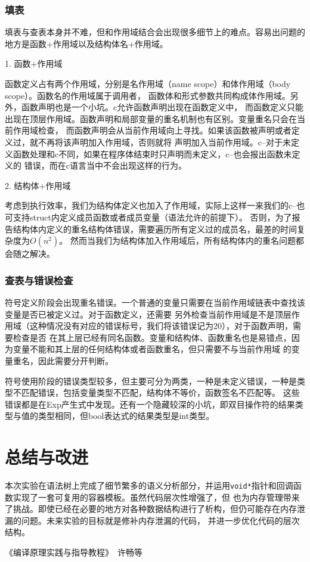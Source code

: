 \documentclass[twocolumn]{article}
\begin{document}
\subsubsection{填表}
填表与查表本身并不难，但和作用域结合会出现很多细节上的难点。容易出问题的地方是函数+作用域以及结构体名+作用域。

1. 函数+作用域

函数定义占有两个作用域，分别是名作用域（name scope）和体作用域（body scope）。函数名的作用域属于调用者，
函数体和形式参数共同构成体作用域。另外，函数声明也是一个小坑。c允许函数声明出现在函数定义中，
而函数定义只能出现在顶层作用域。函数声明和局部变量的重名机制也有区别。变量重名只会在当前作用域检查，
而函数声明会从当前作用域向上寻找。如果该函数被声明或者定义过，就不再将该声明加入作用域，否则就将
声明加入当前作用域。c--对于未定义函数处理和c不同，如果在程序体结束时只声明而未定义，c--也会报出函数未定义的
错误，而在c语言当中不会出现这样的行为。

2. 结构体+作用域

考虑到执行效率，我们为结构体定义也加入了作用域，实际上这样一来我们的c--也可支持struct内定义成员函数或者成员变量（语法允许的前提下）。
否则，为了报告结构体内定义的重名结构体错误，需要遍历所有定义过的成员名，最差的时间复杂度为$O(n^2)$。
然而当我们为结构体加入作用域后，所有结构体内的重名问题都会随之解决。

\subsubsection{查表与错误检查}
符号定义阶段会出现重名错误。一个普通的变量只需要在当前作用域链表中查找该变量是否已被定义过。对于函数定义，还需要
另外检查当前作用域是不是顶层作用域（这种情况没有对应的错误标号，我们将该错误记为20），对于函数声明，需要检查是否
在其上层已经有同名函数。变量和结构体、函数重名也是易错点，因为变量不能和其上层的任何结构体或者函数重名，但只需要不与当前作用域
的变量重名，因此需要分开判断。

符号使用阶段的错误类型较多，但主要可分为两类，一种是未定义错误，一种是类型不匹配错误，包括变量类型不匹配，结构体不等价，函数签名不匹配等。
这些错误都是在Exp产生式中发现。还有一个隐藏较深的小坑，即双目操作符的结果类型与值的类型相同，但bool表达式的结果类型是int类型。


\section{总结与改进}
本次实验在语法树上完成了细节繁多的语义分析部分，并运用\verb|void*|指针和回调函数实现了一套可复用的容器模板。虽然代码层次性增强了，但
也为内存管理带来了挑战。即使已经在必要的地方对各种数据结构进行了析构，但仍可能存在内存泄漏的问题。未来实验的目标就是修补内存泄漏的代码，
并进一步优化代码的层次结构。

\begin{thebibliography}{00}
    《编译原理实践与指导教程》\ 许畅等
\end{thebibliography}
\end{document}
